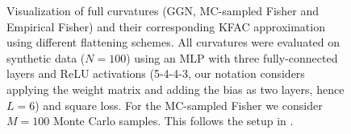 \begin{figure}[t!]
\begin{minipage}[t]{0.485\linewidth}
  \end{minipage}
    \caption{Visualization of full curvatures (GGN, MC-sampled Fisher and Empirical Fisher) and their corresponding KFAC approximation using different flattening schemes. All curvatures were evaluated on synthetic data ($N = 100$) using an MLP with three fully-connected layers and ReLU activations (5-4-4-3, our notation considers applying the weight matrix and adding the bias as two layers, hence $L=6$) and square loss. For the MC-sampled Fisher we consider $M = 100$ Monte Carlo samples. This follows the setup in .}
\end{figure}

